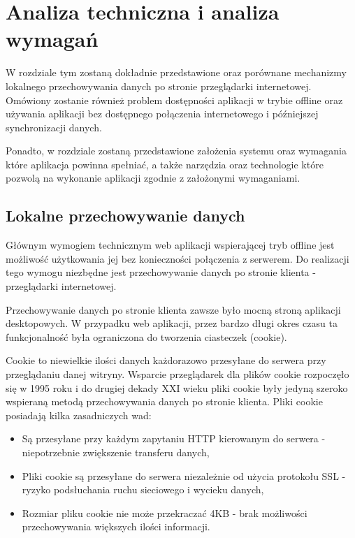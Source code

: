 \chapter{Analiza techniczna i analiza wymagań}
\label{cha:anaTechIAnaWym}

W rozdziale tym zostaną dokładnie przedstawione oraz porównane mechanizmy lokalnego przechowywania danych po stronie przeglądarki internetowej. Omówiony zostanie również problem dostępności aplikacji w trybie offline oraz używania aplikacji bez dostępnego połączenia internetowego i późniejszej synchronizacji danych.

Ponadto, w rozdziale zostaną przedstawione założenia systemu oraz wymagania które aplikacja powinna spełniać, a także narzędzia oraz technologie które pozwolą na wykonanie aplikacji zgodnie z założonymi wymaganiami.

\section{Lokalne przechowywanie danych}
\label{sec:lokPrzechDanych}

Głównym wymogiem technicznym web aplikacji wspierającej tryb offline jest możliwość użytkowania jej bez konieczności połączenia z serwerem. Do realizacji tego wymogu niezbędne jest przechowywanie danych po stronie klienta - przeglądarki internetowej.

Przechowywanie danych po stronie klienta zawsze było mocną stroną aplikacji desktopowych. W przypadku web aplikacji, przez bardzo długi okres czasu ta funkcjonalność była ograniczona do tworzenia ciasteczek (cookie).

Cookie\cite{cookie} to niewielkie ilości danych każdorazowo przesyłane do serwera przy przeglądaniu danej witryny. Wsparcie przeglądarek dla plików cookie rozpoczęło się w 1995 roku i do drugiej dekady XXI wieku pliki cookie były jedyną szeroko wspieraną metodą przechowywania danych po stronie klienta. Pliki cookie posiadają kilka zasadniczych wad:


\begin{itemize}
\item Są przesyłane przy każdym zapytaniu HTTP kierowanym do serwera - niepotrzebnie zwiększenie transferu danych,
\item Pliki cookie są przesyłane do serwera niezależnie od użycia protokołu SSL - ryzyko podsłuchania ruchu sieciowego i wycieku danych,
\item Rozmiar pliku cookie nie może przekraczać 4KB - brak możliwości przechowywania większych ilości informacji.
\end{itemize}

